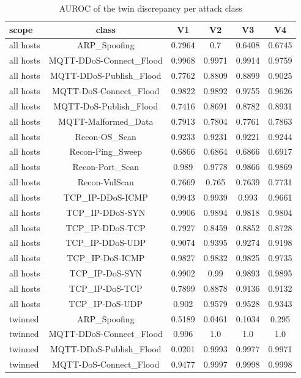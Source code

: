 \begin{table}[htbp]
\centering
\caption{AUROC of the twin discrepancy per attack class}
\label{tab:twin_delta_auroc}
\begin{tabular}{lccccc}
\toprule
scope & class & V1 & V2 & V3 & V4 \\
\midrule
all hosts & ARP\_Spoofing & 0.7964 & 0.7 & 0.6408 & 0.6745 \\
all hosts & MQTT-DDoS-Connect\_Flood & 0.9968 & 0.9971 & 0.9914 & 0.9759 \\
all hosts & MQTT-DDoS-Publish\_Flood & 0.7762 & 0.8809 & 0.8899 & 0.9025 \\
all hosts & MQTT-DoS-Connect\_Flood & 0.9822 & 0.9892 & 0.9755 & 0.9626 \\
all hosts & MQTT-DoS-Publish\_Flood & 0.7416 & 0.8691 & 0.8782 & 0.8931 \\
all hosts & MQTT-Malformed\_Data & 0.7913 & 0.7804 & 0.7761 & 0.7863 \\
all hosts & Recon-OS\_Scan & 0.9233 & 0.9231 & 0.9221 & 0.9244 \\
all hosts & Recon-Ping\_Sweep & 0.6866 & 0.6864 & 0.6866 & 0.6917 \\
all hosts & Recon-Port\_Scan & 0.989 & 0.9778 & 0.9866 & 0.9869 \\
all hosts & Recon-VulScan & 0.7669 & 0.765 & 0.7639 & 0.7731 \\
all hosts & TCP\_IP-DDoS-ICMP & 0.9943 & 0.9939 & 0.993 & 0.9661 \\
all hosts & TCP\_IP-DDoS-SYN & 0.9906 & 0.9894 & 0.9818 & 0.9804 \\
all hosts & TCP\_IP-DDoS-TCP & 0.7927 & 0.8459 & 0.8852 & 0.8728 \\
all hosts & TCP\_IP-DDoS-UDP & 0.9074 & 0.9395 & 0.9274 & 0.9198 \\
all hosts & TCP\_IP-DoS-ICMP & 0.9827 & 0.9832 & 0.9825 & 0.9735 \\
all hosts & TCP\_IP-DoS-SYN & 0.9902 & 0.99 & 0.9893 & 0.9895 \\
all hosts & TCP\_IP-DoS-TCP & 0.7899 & 0.8878 & 0.9136 & 0.9132 \\
all hosts & TCP\_IP-DoS-UDP & 0.902 & 0.9579 & 0.9528 & 0.9343 \\
twinned & ARP\_Spoofing & 0.5189 & 0.0461 & 0.1034 & 0.295 \\
twinned & MQTT-DDoS-Connect\_Flood & 0.996 & 1.0 & 1.0 & 1.0 \\
twinned & MQTT-DDoS-Publish\_Flood & 0.0201 & 0.9993 & 0.9977 & 0.9971 \\
twinned & MQTT-DoS-Connect\_Flood & 0.9477 & 0.9997 & 0.9998 & 0.9998 \\

\end{tabular}
\end{table}

